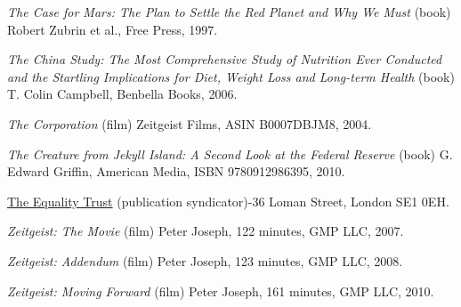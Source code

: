 \item
{\it The Case for Mars: The Plan to Settle the Red Planet and Why We Must} (book)\crlf
Robert Zubrin et al., Free Press, 1997.

\item
{\it The China Study: The Most Comprehensive Study of Nutrition Ever Conducted and the Startling Implications for Diet, Weight Loss and Long-term Health} (book)\crlf
T. Colin Campbell, Benbella Books, 2006.

\item
{\it The Corporation} (film)\crlf
Zeitgeist Films, ASIN B0007DBJM8, 2004.

\item
{\it The Creature from Jekyll Island: A Second Look at the Federal Reserve} (book)\crlf
G. Edward Griffin, American Media, ISBN 9780912986395, 2010.

\item
\href{http://www.equalitytrust.org.uk/resources/publications}{The Equality Trust} (publication syndicator)-36 Loman Street, London SE1 0EH.

\item
{\it Zeitgeist: The Movie} (film)\crlf
Peter Joseph, 122 minutes, GMP LLC, 2007.

\item
{\it Zeitgeist: Addendum} (film)\crlf
Peter Joseph, 123 minutes, GMP LLC, 2008.

\item
{\it Zeitgeist: Moving Forward} (film)\crlf
Peter Joseph, 161 minutes, GMP LLC, 2010.
\stopitemize

